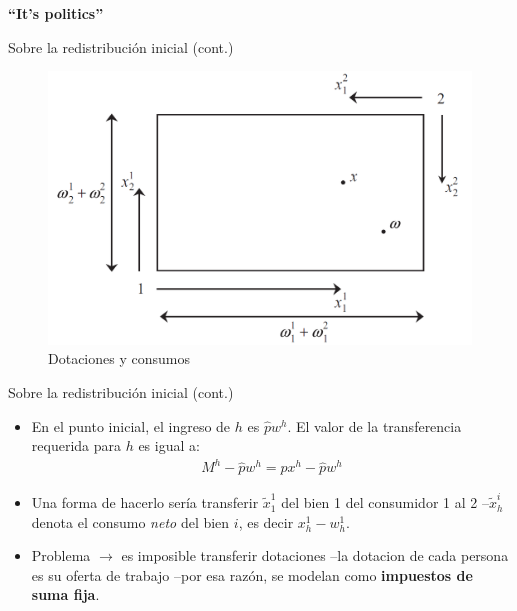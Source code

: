 \documentclass[
  ignorenonframetext,
]{beamer}
\providecommand{\tightlist}{%
  \setlength{\itemsep}{0pt}\setlength{\parskip}{0pt}}\usepackage{longtable,booktabs,array}
\begin{document}
\begin{frame}{\textbf{``It's politics''}}
\begin{block}{Sobre la redistribución inicial (cont.)}
\protect\hypertarget{sobre-la-redistribuciuxf3n-inicial-cont.-1}{}
\begin{figure}

{\centering \includegraphics{fig/fig-01-010.png}

}

\caption{Dotaciones y consumos}

\end{figure}
\end{block}

\begin{block}{Sobre la redistribución inicial (cont.)}
\protect\hypertarget{sobre-la-redistribuciuxf3n-inicial-cont.-2}{}
\begin{itemize}
\tightlist
\item
  En el punto inicial, el ingreso de \(h\) es \(\hat{p}w^{h}\). El valor
  de la transferencia requerida para \(h\) es igual a: \[\begin{aligned}
  M^{h}-\hat{p}w^{h}=\hat{p}x^{h}-\hat{p}w^{h}
  \end{aligned}\]
\item
  Una forma de hacerlo sería transferir \(\tilde{x}_{1}^{1}\) del bien 1
  del consumidor 1 al 2 --\(\tilde{x}_{h}^{i}\) denota el consumo
  \emph{neto} del bien \(i\), es decir \(x_{h}^{1}-w_{h}^{1}\).\\
\item
  Problema \(\longrightarrow\) es imposible transferir dotaciones --la
  dotacion de cada persona es su oferta de trabajo --por esa razón, se
  modelan como \textbf{impuestos de suma fija}.
\end{itemize}
\end{block}


\end{frame}
\end{document}
